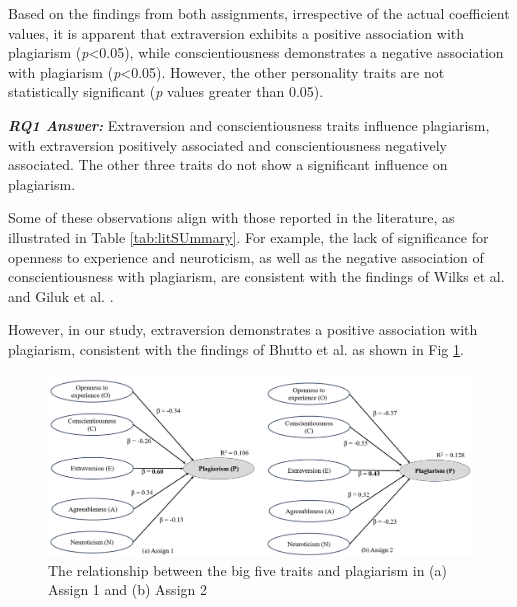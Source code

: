 Based on the findings from both assignments, irrespective of the actual coefficient values, it is apparent that extraversion exhibits a positive association with plagiarism (\textit{p}<0.05), while conscientiousness demonstrates a negative association with plagiarism (\textit{p}<0.05). However, the other personality traits are not statistically significant (\textit{p} values greater than 0.05).

\vspace{8pt}
\begin{mdframed}
\textbf{\textit{RQ1 Answer:}} Extraversion and conscientiousness traits influence plagiarism, with extraversion positively associated and conscientiousness negatively associated. The other three traits do not show a significant influence on plagiarism. 
\end{mdframed}
\vspace{8pt}

Some of these observations align with those reported in the literature, as illustrated in Table \ref{tab:litSUmmary}. For example, the lack of significance for openness to experience and neuroticism, as well as the negative association of conscientiousness with plagiarism, are consistent with the findings of Wilks et al. \cite{Wilks2016-WILPTA-3} and Giluk et al. \cite{Giluk2015BigFP}. 

However, in our study, extraversion demonstrates a positive association with plagiarism, consistent with the findings of Bhutto et al. \cite{Bhutto2019ACS} as shown in Fig \ref{fig:personalityAndPlagiarism}. 

\begin{figure}[H]
  \centering
  \includegraphics[width=\columnwidth]{1.png}
  \caption{The relationship between the big five traits and plagiarism in (a) Assign 1 and (b) Assign 2}
  \label{fig:personalityAndPlagiarism}\vspace{-4pt}
\end{figure}

